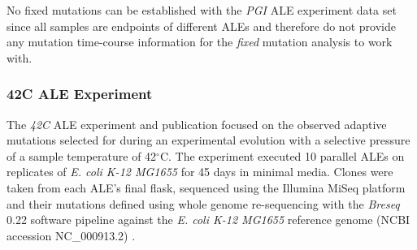\documentclass[12pt,final,masters,chapterheads]{ucsd}  %
\begin{document}
No fixed mutations can be established with the \textit{PGI} ALE experiment data set since all samples are endpoints of different ALEs and therefore do not provide any mutation time-course information for the \textit{fixed} mutation analysis to work with.
\subsubsection{42C ALE Experiment}
The \textit{42C} ALE experiment and publication focused on the observed adaptive mutations selected for during an experimental evolution with a selective pressure of a sample temperature of 42$^{\circ}$C. The experiment executed 10 parallel ALEs on replicates of \textit{E. coli K-12 MG1655} for 45 days in minimal media. Clones were taken from each ALE's final flask, sequenced using the Illumina MiSeq platform and their mutations defined using whole genome re-sequencing with the \textit{Breseq} 0.22 software pipeline against the \textit{E. coli K-12 MG1655} reference genome (NCBI accession NC\_000913.2) \cite{pmid25015645}.
\end{document}
